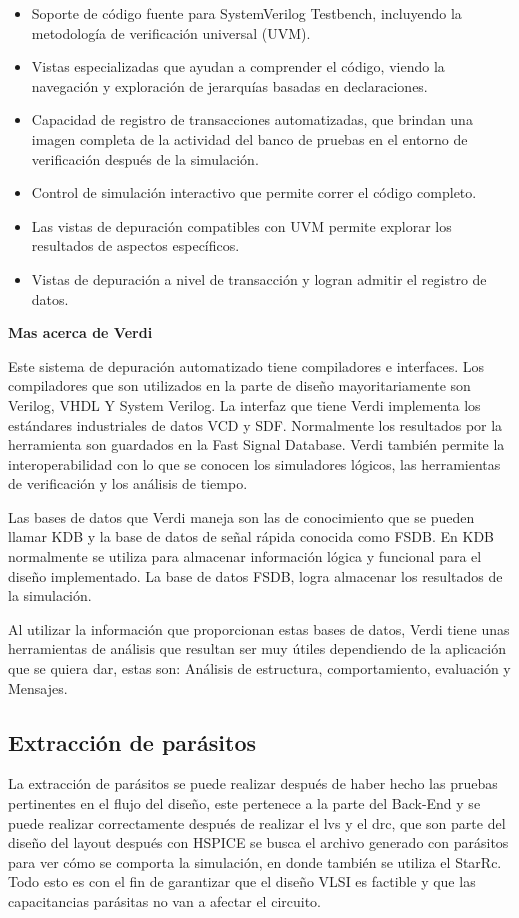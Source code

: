 \begin{itemize}
    \item Soporte de código fuente para SystemVerilog Testbench, incluyendo la metodología de verificación universal (UVM).
    \item Vistas especializadas que ayudan a comprender el código, viendo la navegación y exploración de jerarquías basadas en declaraciones.
    \item Capacidad de registro de transacciones automatizadas, que brindan una imagen completa de la actividad del banco de pruebas en el entorno de verificación después de la simulación.
    \item Control de simulación interactivo que permite correr el código completo.
    \item Las vistas de depuración compatibles con UVM permite explorar los resultados de aspectos específicos.
    \item Vistas de depuración a nivel de transacción y logran admitir el registro de datos.
\end{itemize}

 \cite{Jeff} 

\textbf{Mas acerca de Verdi}


Este sistema de depuración automatizado tiene compiladores e interfaces.
Los compiladores que son utilizados en la parte de diseño mayoritariamente son Verilog, VHDL Y System Verilog. La interfaz que tiene Verdi implementa los estándares industriales de datos VCD y SDF. Normalmente los resultados por la herramienta son guardados en la Fast Signal Database.  Verdi también permite la interoperabilidad con lo que se conocen los simuladores lógicos, las herramientas de verificación y los análisis de tiempo.

Las bases de datos que Verdi maneja son las de conocimiento que se pueden llamar KDB y la base de datos de señal rápida conocida como FSDB. En KDB normalmente se utiliza para almacenar información lógica y funcional para el diseño implementado.
La base de datos FSDB, logra almacenar los resultados de la simulación.

Al utilizar la información que proporcionan estas bases de datos, Verdi tiene unas herramientas de análisis que resultan ser muy útiles dependiendo de la aplicación que se quiera dar, estas son: Análisis de estructura, comportamiento, evaluación y Mensajes.



 \subsection*{Extracción de parásitos}
La extracción de parásitos se puede realizar después de haber hecho las pruebas pertinentes en el flujo del diseño, este pertenece a la parte del Back-End y se puede realizar correctamente después de realizar el lvs y el drc, que son parte del diseño del layout después con HSPICE se busca el archivo generado con parásitos para ver cómo se comporta la simulación, en donde también se utiliza el StarRc. Todo esto es con el fin de garantizar que el diseño VLSI es factible y que las capacitancias parásitas no van a afectar el circuito.

